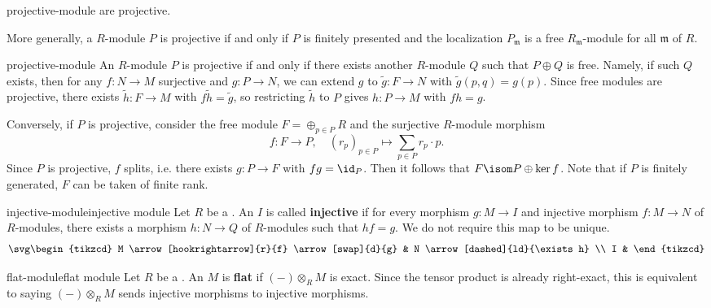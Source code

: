 \begin{example}{projective-module}
     are projective.
    
    More generally, a  $R$-module $P$ is projective if and only if $P$ is finitely presented and the localization $P_\mathfrak{m}$ is a free $R_\mathfrak{m}$-module for all  $\mathfrak{m}$ of $R$.
\end{example}

\begin{example}{projective-module}
    An $R$-module $P$ is projective if and only if there exists another $R$-module $Q$ such that $P \oplus Q$ is free. Namely, if such $Q$ exists, then for any $f : N \to M$ surjective and $g : P \to N$, we can extend $g$ to $\tilde{g} : F \to N$ with $\tilde{g}(p, q) = g(p)$. Since free modules are projective, there exists $\tilde{h} : F \to M$ with $f \tilde{h} = \tilde{g}$, so restricting $\tilde{h}$ to $P$ gives $h : P \to M$ with $fh = g$.
    
    Conversely, if $P$ is projective, consider the free module $F = \oplus_{p \in P} R$ and the surjective $R$-module morphism
    \[ f : F \to P, \quad (r_p)_{p \in P} \mapsto \sum_{p \in P} r_p \cdot p . \]
    Since $P$ is projective, $f$ splits, i.e. there exists $g : P \to F$ with $fg = \id_P$. Then it follows that $F \isom P \oplus \ker f$. Note that if $P$ is finitely generated, $F$ can be taken of finite rank.
\end{example}

\begin{topic}{injective-module}{injective module}
    Let $R$ be a . An  $I$ is called \textbf{injective} if for every morphism $g : M \to I$ and injective morphism $f : M \to N$ of $R$-modules, there exists a morphism $h : N \to Q$ of $R$-modules such that $hf = g$. We do not require this map to be unique.
    \[ \svg \begin{tikzcd} M \arrow[hookrightarrow]{r}{f} \arrow[swap]{d}{g} & N \arrow[dashed]{ld}{\exists h} \\ I & \end{tikzcd} \]
\end{topic}

\begin{topic}{flat-module}{flat module}
    Let $R$ be a . An  $M$ is \textbf{flat} if $(-) \otimes_R M$ is exact. Since the tensor product is already right-exact, this is equivalent to saying $(-) \otimes_R M$ sends injective morphisms to injective morphisms.
\end{topic}

